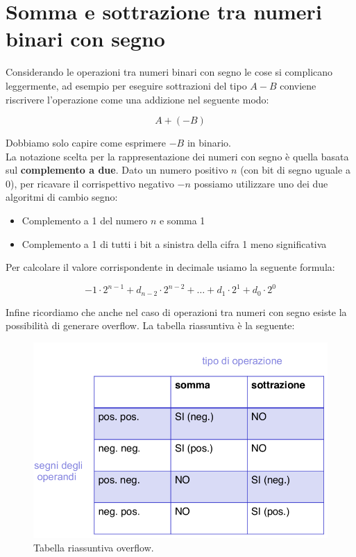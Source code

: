 \documentclass{article}
\begin{document}
\begin{enumerate}
\begin{center}
\end{center}

\end{enumerate}

\section{Somma e sottrazione tra numeri binari con segno}


Considerando le operazioni tra numeri binari con segno le cose si complicano leggermente, ad esempio per eseguire sottrazioni del tipo $A-B$ conviene riscrivere l'operazione come una addizione nel seguente modo:

$$ A+(-B) $$

\noindent Dobbiamo solo capire come esprimere $-B$ in binario.\\

\noindent La notazione scelta per la rappresentazione dei numeri con segno  \`e quella basata sul \textbf{complemento a due}.
Dato un numero positivo $n$ (con bit di segno uguale a 0), per ricavare il corrispettivo negativo $-n$ possiamo utilizzare uno dei due algoritmi di cambio segno:
\begin{itemize}
\item Complemento a 1 del numero $n$ e somma 1
\item Complemento a 1 di tutti i bit a sinistra della cifra 1 meno significativa
\end{itemize}

\noindent Per calcolare il valore corrispondente in decimale usiamo la seguente formula:

$$
-1\cdot 2^{n-1}+d_{n-2}\cdot 2^{n-2}+\dots+ d_{1}\cdot 2^{1}+d_{0}\cdot 2^{0}
$$

Infine ricordiamo che anche nel caso di operazioni tra numeri con segno esiste la possibilit\`a di generare overflow. La tabella riassuntiva \`e la seguente:

\begin{figure}
  \includegraphics[width=0.7\linewidth]{overflow.png}
  \caption{Tabella riassuntiva overflow.}
\end{figure}
\end{document}
